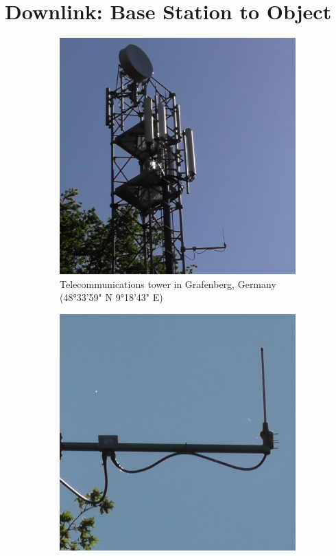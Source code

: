 \chapter{Downlink: Base Station to Object}
\label{sec:downlink}

\begin{figure}[h]
\centering
\begin{subfigure}[t]{0.31\textwidth}
	\centering
	\includegraphics[width=\textwidth]{fig/tower_grafenberg.jpg}
	\caption{Telecommunications tower in Grafenberg, Germany (48°33'59" N \hspace{4pt} 9°18'43" E)}
\end{subfigure}
\hspace{0.02\textwidth}
\begin{subfigure}[t]{0.31\textwidth}
	\centering
	\includegraphics[width=\textwidth]{fig/antenna_grafenberg.jpg}

\end{subfigure}
\end{figure}
